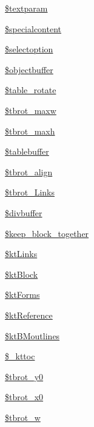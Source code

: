 \begin{DoxyCompactItemize}
\item 
\hyperlink{classm_p_d_f_a1b9bfa52366e53122658d5024e3e6698}{\$textparam}
\item 
\hyperlink{classm_p_d_f_a5ed50e37ca659adcbd0e0cccf45d7e81}{\$specialcontent}
\item 
\hyperlink{classm_p_d_f_aedf7ce15145835671cc8936cd3a893ed}{\$selectoption}
\item 
\hyperlink{classm_p_d_f_a104049f281f613487a8263a45a1a0922}{\$objectbuffer}
\item 
\hyperlink{classm_p_d_f_ab9c596a8ebf573b8505982cb2bf95f2c}{\$table\-\_\-rotate}
\item 
\hyperlink{classm_p_d_f_a87b76dd4f1f6cc8f19c6135f82605965}{\$tbrot\-\_\-maxw}
\item 
\hyperlink{classm_p_d_f_af918142572c97f0877c2efad7c26ea51}{\$tbrot\-\_\-maxh}
\item 
\hyperlink{classm_p_d_f_a16baa9e1e5961668b998e7fbe035dd48}{\$tablebuffer}
\item 
\hyperlink{classm_p_d_f_abbe73513ed64f329f603476d6a39a88d}{\$tbrot\-\_\-align}
\item 
\hyperlink{classm_p_d_f_a541fb16701b3827a5458de28cb2d051e}{\$tbrot\-\_\-\-Links}
\item 
\hyperlink{classm_p_d_f_acae71c25a6f1215673f371c9cc5d9742}{\$divbuffer}
\item 
\hyperlink{classm_p_d_f_a106a7ef02b2faf856724e2284b7a20c3}{\$keep\-\_\-block\-\_\-together}
\item 
\hyperlink{classm_p_d_f_a2deca48adce1e6d5e528e21ccb28764e}{\$kt\-Links}
\item 
\hyperlink{classm_p_d_f_a2219c6a1c3d263e274d108fed5dde5fa}{\$kt\-Block}
\item 
\hyperlink{classm_p_d_f_a6e93b00ddda2a234d4c0c66d787165f8}{\$kt\-Forms}
\item 
\hyperlink{classm_p_d_f_a4c49c772c0c36ef2eb64006871126bb7}{\$kt\-Reference}
\item 
\hyperlink{classm_p_d_f_a7d8400347df095a776f241ad6058652b}{\$kt\-B\-Moutlines}
\item 
\hyperlink{classm_p_d_f_a4da9bbd16fd880722d8fb1475a9bcaea}{\$\-\_\-kttoc}
\item 
\hyperlink{classm_p_d_f_a0135161d62802aa6eb3e53bca83a5cac}{\$tbrot\-\_\-y0}
\item 
\hyperlink{classm_p_d_f_a7c34b9d5d3561a2c82d2e4dc8928ea97}{\$tbrot\-\_\-x0}
\item 
\hyperlink{classm_p_d_f_ae53b8f01c33620a23566ec5d47afc31b}{\$tbrot\-\_\-w}
\item 

\end{DoxyCompactItemize}
